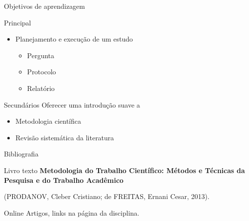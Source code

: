\documentclass{beamer}
\begin{document}
\begin{frame}[label=objetivo]{Objetivos de aprendizagem}
  \begin{block}{Principal}
    \begin{itemize}
      \large
    \item Planejamento e execução de um estudo
      \begin{itemize}
      \item Pergunta
      \item Protocolo
      \item Relatório
      \end{itemize}
    \end{itemize}
  \end{block}
  \bigskip
  \bigskip
  \begin{block}{Secundários}
    \small
    Oferecer uma introdução suave a
    \begin{itemize}
    \item Metodologia científica
    \item Revisão sistemática da literatura
    \end{itemize}
  \end{block}
\end{frame}

\begin{frame}{Bibliografia}
  \begin{block}{Livro texto}
    \scriptsize
    {\bf Metodologia do Trabalho Científico: Métodos e Técnicas da Pesquisa e do Trabalho Acadêmico}

    \bigskip
    (PRODANOV, Cleber Cristiano; de FREITAS, Ernani Cesar, 2013).
  \end{block}
  \bigskip
  \bigskip
  \begin{block}{Online}
    \small
    Artigos, links na página da disciplina.
  \end{block}
\end{frame}
\end{document}
